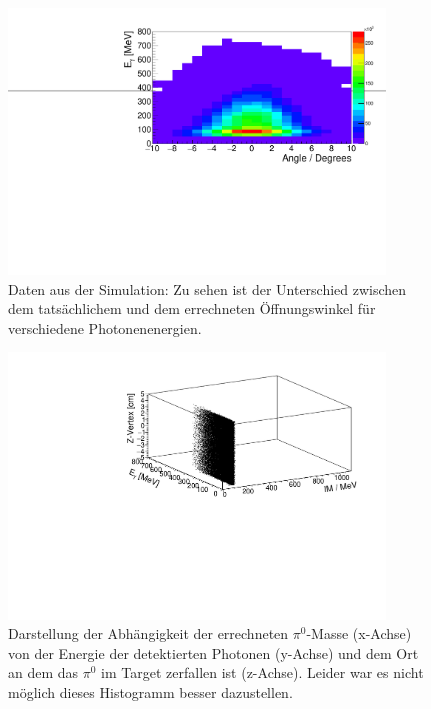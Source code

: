 \documentclass[a4paper,11pt,oneside,final,german,openbib,pdftex]{scrbook}
\begin{document}
{\begin{appendix}
\begin{figure}[h!]
	\begin{center}
		\includegraphics[width=100mm]{NewCalib/20171904SimOpeningAngleDeviation}
		\caption[Simulation: Unterschied zwischen dem rekontruiertem und den errechneten \"Offnungswinkel]{Daten aus der Simulation: Zu sehen ist der Unterschied zwischen dem tats\"achlichem und dem errechneten \"Offnungswinkel f\"ur verschiedene Photonenenergien.}
		\label{fig:Unterschied-Rec-Gen-Opening-Angle}
	\end{center}
\end{figure}


\begin{figure}[h!]
	\begin{center}
		\includegraphics[width=100mm]{NewCalib/20171904SimZVertex3DHist}
		\caption[Simulation: 3D-Hist Z-Vertex]{Darstellung der Abh\"angigkeit der errechneten $\pi^0$-Masse (x-Achse) von der Energie der detektierten Photonen (y-Achse) und dem Ort an dem das $\pi^0$ im Target zerfallen ist (z-Achse).
		Leider war es nicht m\"oglich dieses Histogramm besser dazustellen.}
	\label{fig:Z-Vertex-3D-Hist}
	\end{center}
\end{figure}



\end{appendix}}
\end{document}
